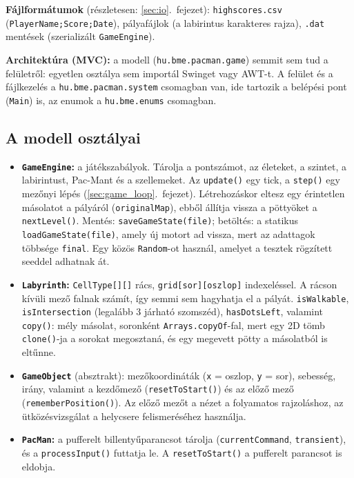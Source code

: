 \documentclass[11pt, a4paper]{article}
\begin{document}
\textbf{Fájlformátumok} (részletesen: \ref{sec:io}.~fejezet): \texttt{highscores.csv} (\texttt{PlayerName;Score;Date}), pályafájlok (a labirintus karakteres rajza), \texttt{.dat} mentések (szerializált \texttt{GameEngine}).

\textbf{Architektúra (MVC):} a modell (\texttt{hu.bme.pacman.game}) semmit sem tud a felületről: egyetlen osztálya sem importál Swinget vagy AWT-t. A felület és a fájlkezelés a \texttt{hu.bme.pacman.system} csomagban van, ide tartozik a belépési pont (\texttt{Main}) is, az enumok a \texttt{hu.bme.enums} csomagban.

\subsection*{A modell osztályai}
\begin{itemize}[itemsep=2pt]
    \item \textbf{\texttt{GameEngine}:} a játékszabályok. Tárolja a pontszámot, az életeket, a szintet, a labirintust, Pac-Mant és a szellemeket. Az \texttt{update()} egy tick, a \texttt{step()} egy mezőnyi lépés (\ref{sec:game_loop}.~fejezet). Létrehozáskor eltesz egy érintetlen másolatot a pályáról (\texttt{originalMap}), ebből állítja vissza a pöttyöket a \texttt{nextLevel()}. Mentés: \texttt{saveGameState(file)}; betöltés: a statikus \texttt{loadGameState(file)}, amely új motort ad vissza, mert az adattagok többsége \texttt{final}. Egy közös \texttt{Random}-ot használ, amelyet a tesztek rögzített seeddel adhatnak át.
    \item \textbf{\texttt{Labyrinth}:} \texttt{CellType[][]} rács, \texttt{grid[sor][oszlop]} indexeléssel. A rácson kívüli mező falnak számít, így semmi sem hagyhatja el a pályát. \texttt{isWalkable}, \texttt{isIntersection} (legalább 3 járható szomszéd), \texttt{hasDotsLeft}, valamint \texttt{copy()}: mély másolat, soronként \texttt{Arrays.copyOf}-fal, mert egy 2D tömb \texttt{clone()}-ja a sorokat megosztaná, és egy megevett pötty a másolatból is eltűnne.
    \item \textbf{\texttt{GameObject}} (absztrakt): mezőkoordináták (\texttt{x} = oszlop, \texttt{y} = sor), sebesség, irány, valamint a kezdőmező (\texttt{resetToStart()}) és az előző mező (\texttt{rememberPosition()}). Az előző mezőt a nézet a folyamatos rajzoláshoz, az ütközésvizsgálat a helycsere felismeréséhez használja.
    \item \textbf{\texttt{PacMan}:} a pufferelt billentyűparancsot tárolja (\texttt{currentCommand}, \texttt{transient}), és a \texttt{processInput()} futtatja le. A \texttt{resetToStart()} a pufferelt parancsot is eldobja.

\end{itemize}
\end{document}
